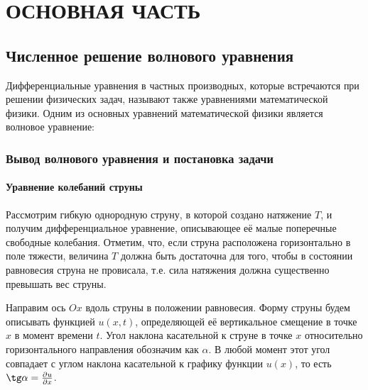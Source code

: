 \documentclass[12pt,a4paper,russian]{report}
\renewcommand*{\contentsname}{СОДЕРЖАНИЕ}
\begin{document}
	
	\renewcommand{\contentsname}{СОДЕРЖАНИЕ} 
	\tableofcontents
	
	
	
	\newpage
	\chapter*{ОСНОВНАЯ ЧАСТЬ}
	
	
	
	\section{Численное решение волнового уравнения}
	
	Дифференциальные уравнения в частных производных, которые встречаются при решении физических задач, называют также уравнениями математической физики. Одним из основных уравнений математической физики является волновое уравнение:
	
	
	\subsection{Вывод волнового уравнения и постановка задачи}
	
	
	\subsubsection{Уравнение колебаний струны}
	
	Рассмотрим гибкую однородную струну, в которой создано натяжение $T$, и получим дифференциальное уравнение, описывающее её малые поперечные свободные колебания. Отметим, что, если струна расположена горизонтально в поле тяжести, величина $T$ должна быть достаточна для того, чтобы в состоянии равновесия струна не провисала, т.е. сила натяжения должна существенно превышать вес струны. 
	
	Направим ось $Ox$ вдоль струны в положении равновесия. Форму струны будем описывать функцией $u(x, t)$, определяющей её вертикальное смещение в точке $x$ в момент времени $t$. Угол наклона касательной к струне в точке $x$ относительно горизонтального направления обозначим как $\alpha$. В любой момент этот угол совпадает с углом наклона касательной к графику функции $u(x)$, то есть $\tg \alpha = \frac{\partial u}{\partial x}$. 
	
\end{document}
